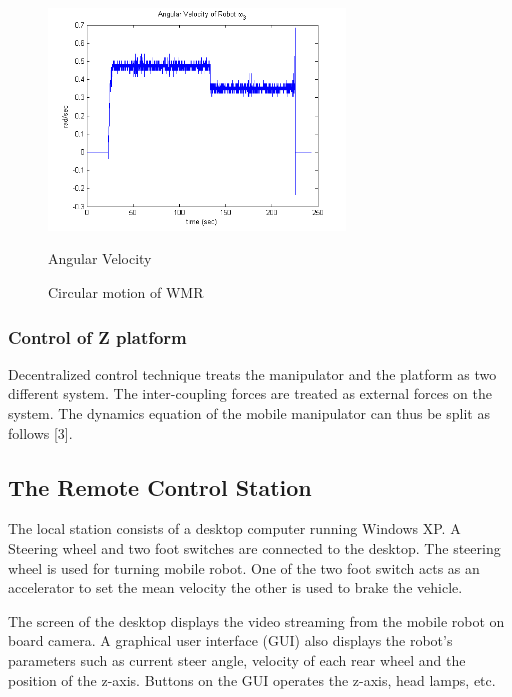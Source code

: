 \begin{figure}
\hfill
\begin{minipage}[t]{0.5\textwidth}
	\centering
	\includegraphics[width=3.1in]{Chapter5/fig/cirOmega} 
	\caption{Angular Velocity}\label{fig:cirOmega}
\end{minipage}
	\caption{Circular motion of  WMR}
\end{figure}
\subsubsection{Control of Z platform}
Decentralized control technique treats the manipulator and the platform as two different system. The inter-coupling forces are treated as external forces on the system. The dynamics equation of the mobile manipulator can thus be split as follows [3].
\subsection{The Remote Control Station}   
The local station consists of a desktop computer running Windows XP. A Steering wheel and two foot switches are connected to the desktop. The steering wheel is used for turning  mobile robot. One of the two foot switch acts as an accelerator to set the mean velocity the other  is used to brake the vehicle.

The screen of the desktop displays the video streaming  from the mobile robot on board camera. A graphical user  interface (GUI) also displays the robot's parameters such as current steer angle, velocity of each rear wheel and the position of the z-axis. Buttons on the GUI operates the z-axis, head lamps, etc.

